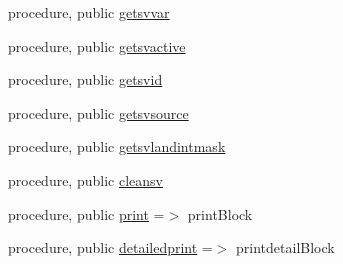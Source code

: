 \begin{DoxyCompactItemize}
\item 
procedure, public \mbox{\hyperlink{structblocks__mod_1_1block__class_a16587b020185447a1ff1c398e23ddd5e}{getsvvar}}
\item 
procedure, public \mbox{\hyperlink{structblocks__mod_1_1block__class_ac487bb271919ea944d58ff2cb1b9899e}{getsvactive}}
\item 
procedure, public \mbox{\hyperlink{structblocks__mod_1_1block__class_ad6605f97a406b2f7e3c95b7ce4ca994d}{getsvid}}
\item 
procedure, public \mbox{\hyperlink{structblocks__mod_1_1block__class_aa94c1e7e359c2b943c711d85d4edee3c}{getsvsource}}
\item 
procedure, public \mbox{\hyperlink{structblocks__mod_1_1block__class_a953609bdf877e35ff4776a4f753d35c3}{getsvlandintmask}}
\item 
procedure, public \mbox{\hyperlink{structblocks__mod_1_1block__class_a17439a0d58c047428bee213d2a7b4bd5}{cleansv}}
\item 
procedure, public \mbox{\hyperlink{structblocks__mod_1_1block__class_a43b4c133934eaadb55d30cf834d1e28c}{print}} =$>$ print\+Block
\item 
procedure, public \mbox{\hyperlink{structblocks__mod_1_1block__class_a937d8dca8393460bc718dafa8a5c03ac}{detailedprint}} =$>$ printdetail\+Block
\end{DoxyCompactItemize}
